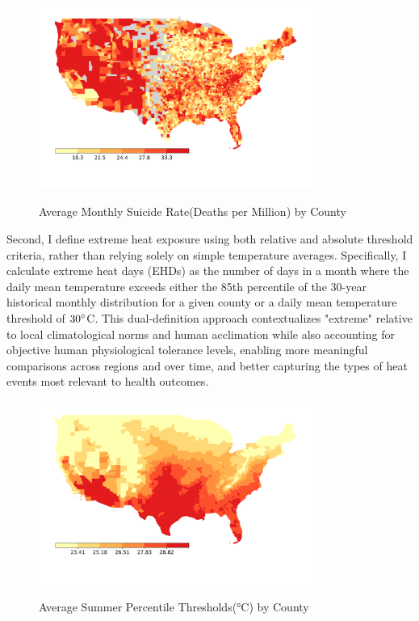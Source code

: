 \documentclass[12pt, a4paper]{article}
\begin{document}
\begin{figure}[H]
    \centering
    \caption{Average Monthly Suicide Rate(Deaths per Million) by County}
    \includegraphics[width=0.8\textwidth]{suicide map.png}
    \label{fig:suicide_map}
\end{figure}

Second, I define extreme heat exposure using both relative and absolute threshold criteria, rather than relying solely on simple temperature averages. Specifically, I calculate extreme heat days (EHDs) as the number of days in a month where the daily mean temperature exceeds either the 85th percentile of the 30-year historical monthly distribution for a given county or a daily mean temperature threshold of $30\degree$C. This dual-definition approach contextualizes "extreme" relative to local climatological norms and human acclimation \cite{periard2016} while also accounting for objective human physiological tolerance levels, enabling more meaningful comparisons across regions and over time, and better capturing the types of heat events most relevant to health outcomes.

\begin{figure}[H]
    \centering
    \caption{Average Summer Percentile Thresholds(°C) by County}
    \includegraphics[width=0.8\textwidth]{thresholds.png}
    \label{fig:thresholds_map}
\end{figure}
\end{document}
